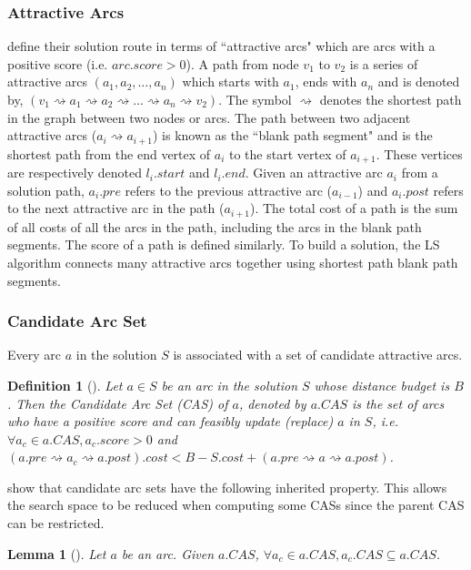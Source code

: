 \documentclass[11pt]{article}
\newtheorem{lemma}{Lemma}
\newtheorem{definition}{Definition}
\newcommand{\sse}{\subseteq} %
\newcommand{\spa}{\rightsquigarrow}
\begin{document}
\subsubsection{Attractive Arcs}
\citeauthor{lu2015arc} define their solution route in terms of ``attractive arcs" which are arcs with a positive score (i.e. $arc.score > 0$). A path from node $v_1$ to $v_2$ is a series of attractive arcs $(a_1, a_2, \ldots, a_n)$ which starts with $a_1$, ends with $a_n$ and is denoted by, $(v_1 \spa a_1 \spa a_2 \spa \ldots \spa a_n \spa v_2)$. The symbol $\spa$ denotes the shortest path in the graph between two nodes or arcs. The path between two adjacent attractive arcs ($a_i \spa  a_{i+1}$) is known as the ``blank path segment" and is the shortest path from the end vertex of $a_i$ to the start vertex of $a_{i+1}$. These vertices are respectively denoted $l_i.start$ and $l_i.end$. Given an attractive arc $a_i$ from a solution path, $a_i.pre$ refers to the previous attractive arc ($a_{i-1}$) and $a_i.post$ refers to the next attractive arc in the path ($a_{i+1}$). The total cost of a path is the sum of all costs of all the arcs in the path, including the arcs in the blank path segments. The score of a path is defined similarly. To build a solution, the LS algorithm connects many attractive arcs together using shortest path blank path segments.

\subsubsection{Candidate Arc Set}
Every arc $a$ in the solution $S$ is associated with a set of candidate attractive arcs. 
%
%
\begin{definition}[\cite{lu2015arc}]
    Let $a \in S$ be an arc in the solution $S$ whose distance budget is $B$. Then the Candidate Arc Set (CAS) of $a$, denoted by $a.CAS$ is the set of arcs who have a positive score and can feasibly update (replace) $a$ in $S$, i.e. $\forall a_c \in a.CAS, a_c.score > 0$ and $(a.pre \spa a_c \spa a.post).cost < B - S.cost + (a.pre \spa a \spa a.post)$.
\end{definition}

\citeauthor{lu2015arc} show that candidate arc sets have the following inherited property. This allows the search space to be reduced when computing some CASs since the parent CAS can be restricted.
\begin{lemma}[\cite{lu2015arc}] Let $a$ be an arc. Given $a.CAS$, $\forall a_c \in a.CAS, a_c.CAS \sse a.CAS$.
\end{lemma}
\end{document}
